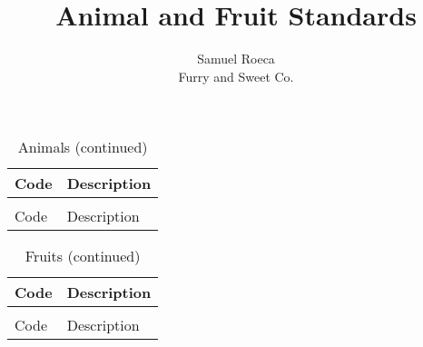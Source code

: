 \documentclass{article}
\title{Animal and Fruit Standards}
\date{}
\author{Samuel Roeca\\ Furry and Sweet Co.}
\newcommand{\customtable}[2] {
  \begin{longtable}{| l | l |}
    \caption{#1} \\
    \hline
    Code & Description \\
    \hline
    \endfirsthead
    \caption[]{#1 (continued)} \\
    \hline
    Code & Description \\
    \hline
    \endhead
    
    \hline
  \end{longtable}
}
\begin{document}
\maketitle
\newpage
\customtable{Animals}{./animals.tex}
\newpage
\customtable{Fruits}{./fruits.tex}
\end{document}
